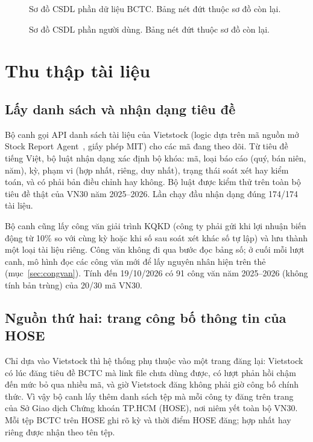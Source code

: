\documentclass[12pt,a4paper]{report}
\begin{document}
\begin{figure}[H]
\centering
\resizebox{\linewidth}{!}{}
\caption{Sơ đồ CSDL phần dữ liệu BCTC. Bảng nét đứt thuộc sơ đồ còn lại.}\label{fig:erd-bctc}
\end{figure}

\begin{figure}[H]
\centering
\resizebox{\linewidth}{!}{}
\caption{Sơ đồ CSDL phần người dùng. Bảng nét đứt thuộc sơ đồ còn lại.}\label{fig:erd-nd}
\end{figure}

\section{Thu thập tài liệu}
\subsection{Lấy danh sách và nhận dạng tiêu đề}
Bộ canh gọi API danh sách tài liệu của Vietstock (logic dựa trên mã nguồn mở Stock Report Agent~\cite{prevcohort},
giấy phép MIT) cho các mã đang theo dõi. Từ tiêu đề tiếng
Việt, bộ luật nhận dạng xác định bộ khóa: mã, loại báo cáo (quý, bán niên, năm),
kỳ, phạm vi (hợp nhất, riêng, duy nhất), trạng thái soát xét hay kiểm toán, và có phải bản điều chỉnh hay không.
Bộ luật được kiểm thử trên toàn bộ tiêu đề thật của VN30 năm 2025--2026. Lần chạy đầu nhận dạng đúng 174/174 tài liệu.

Bộ canh cũng lấy công văn giải trình KQKD (công ty phải gửi khi lợi nhuận biến động từ 10\% so với cùng kỳ hoặc khi
số sau soát xét khác số tự lập) và lưu thành một loại tài liệu riêng. Công văn không đi qua bước đọc bảng số; ở cuối
mỗi lượt canh, mô hình đọc các công văn mới để lấy nguyên nhân hiện trên thẻ (mục~\ref{sec:congvan}). Tính đến
19/10/2026 có 91 công văn năm 2025--2026 (không tính bản trùng) của 20/30 mã VN30.

\subsection{Nguồn thứ hai: trang công bố thông tin của HOSE}
Chỉ dựa vào Vietstock thì hệ thống phụ thuộc vào một trang đăng lại: Vietstock có lúc đăng tiêu đề BCTC mà link file
chưa dùng được, có lượt phản hồi chậm đến mức bỏ qua nhiều mã, và giờ Vietstock đăng không phải giờ công bố chính thức.
Vì vậy bộ canh lấy thêm danh sách tệp mà mỗi công ty đăng trên trang của Sở Giao dịch Chứng khoán TP.HCM (HOSE), nơi
niêm yết toàn bộ VN30. Mỗi tệp BCTC trên HOSE ghi rõ kỳ và thời điểm HOSE đăng; hợp nhất hay riêng được nhận theo tên
tệp.
\end{document}
